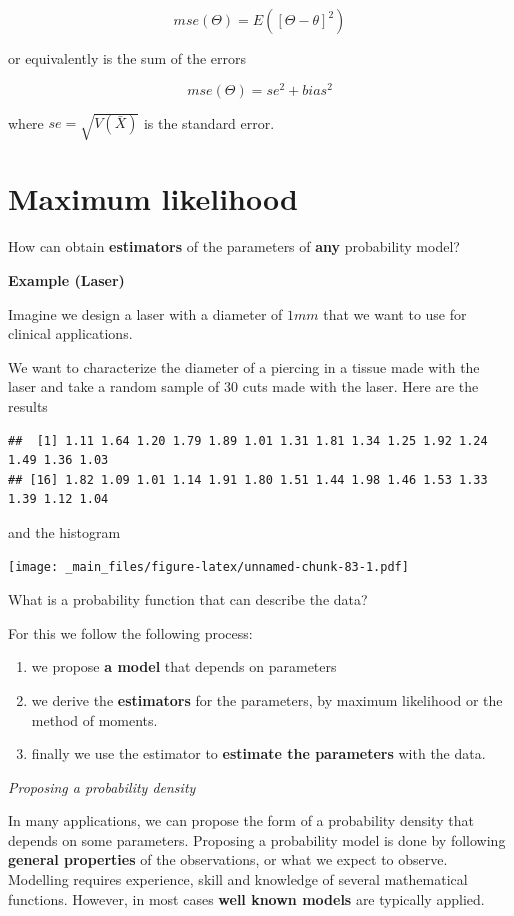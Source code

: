 \documentclass[
]{book}
\providecommand{\tightlist}{%
  \setlength{\itemsep}{0pt}\setlength{\parskip}{0pt}}
\begin{document}
\[mse(\Theta)=E([\Theta - \theta]^2)\]

or equivalently is the sum of the errors

\[mse(\Theta)=se^2 + bias^2\]

where \(se=\sqrt{V(\bar{X})}\) is the standard error.

\hypertarget{maximum-likelihood}{%
\section{Maximum likelihood}\label{maximum-likelihood}}

How can obtain \textbf{estimators} of the parameters of \textbf{any} probability model?

\textbf{Example (Laser)}

Imagine we design a laser with a diameter of \(1mm\) that we want to use for clinical applications.

We want to characterize the diameter of a piercing in a tissue made with the laser and take a random sample of \(30\) cuts made with the laser. Here are the results

\begin{verbatim}
##  [1] 1.11 1.64 1.20 1.79 1.89 1.01 1.31 1.81 1.34 1.25 1.92 1.24 1.49 1.36 1.03
## [16] 1.82 1.09 1.01 1.14 1.91 1.80 1.51 1.44 1.98 1.46 1.53 1.33 1.39 1.12 1.04
\end{verbatim}

and the histogram

\texttt{[image: \_main\_files/figure-latex/unnamed-chunk-83-1.pdf]}

What is a probability function that can describe the data?

For this we follow the following process:

\begin{enumerate}
\def\labelenumi{\arabic{enumi}.}
\tightlist
\item
  we propose \textbf{a model} that depends on parameters
\item
  we derive the \textbf{estimators} for the parameters, by maximum likelihood or the method of moments.
\item
  finally we use the estimator to \textbf{estimate the parameters} with the data.
\end{enumerate}

\emph{Proposing a probability density}

In many applications, we can propose the form of a probability density that depends on some parameters. Proposing a probability model is done by following \textbf{general properties} of the observations, or what we expect to observe. Modelling requires experience, skill and knowledge of several mathematical functions. However, in most cases \textbf{well known models} are typically applied.
\end{document}
